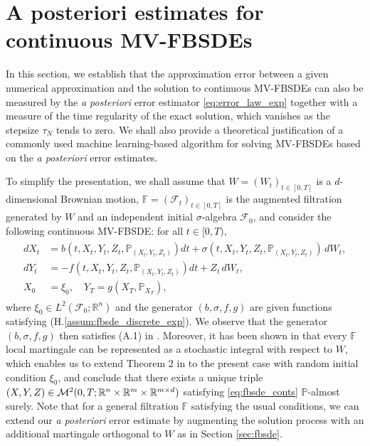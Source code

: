 \documentclass[11pt]{article}
\numberwithin{equation}{section}
\theoremstyle{definition}
\theoremstyle{remark}
\def\Om{\Omega}  \def\om{\omega} %
\newcommand{\q}{\quad}   \newcommand{\qq}{\qquad}
\def\l{\label}  \def\f{\frac}  \def\fa{\forall}
\def\cF{\mathcal{F}}
\def\cM{\mathcal{M}}
\def\sF{{\mathbb{F}}}
\def\sP{\mathbb{P}}
\def\sR{{\mathbb R}}
\begin{document}
\section{A posteriori  estimates for continuous MV-FBSDEs}\l{sec:a_posteriori_conts}
In this section, we  
  establish that 
 the  approximation error between a given numerical approximation and the solution to  continuous MV-FBSDEs
 can also be measured by the \textit{a posteriori} error estimator \eqref{eq:error_law_exp}
  together with
  a measure of 
    the time regularity of the exact solution, which vanishes as the  stepsize $\tau_N$ tends to zero.
{We shall also provide a theoretical justification 
of a commonly used machine learning-based algorithm for solving MV-FBSDEs
based on  the \textit{a posteriori}  error estimates.}


To simplify the presentation, 
we shall assume that
 $W=(W_t)_{t\in [0,T]}$  is
 a $d$-dimensional Brownian motion,
 $\sF=(\cF_t)_{t\in [0,T]}$ is the augmented filtration generated by $W$ and an independent initial $\sigma$-algebra $\cF_0$,
and consider the  following continuous MV-FBSDE: for all $t\in [0,T)$,
\begin{align}\l{eq:fbsde_conts}
\begin{split}
d X_t&=b(t,X_t,Y_t,Z_t,\sP_{(X_t,Y_t,Z_t)})dt +\sigma (t,X_t,Y_t,Z_t,\sP_{(X_t,Y_t,Z_t)})\, d W_t, 
\\
d Y_t&=-f(t,X_t,Y_t,Z_t, \sP_{(X_t,Y_t,Z_t)})dt+Z_t\,d W_t,
\\
X_0&=\xi_0,\q Y_T=g(X_T,\sP_{X_T}),
\end{split}
\end{align}
 where
 $\xi_0\in L^2(\cF_0;\sR^n)$ and
  the generator $(b, \sigma, f, g)$ are given functions satisfying 
 (H.\ref{assum:fbsde_discrete_exp}).
We observe that the generator $(b, \sigma, f, g)$ then satisfies  (A.1) in \cite{bensoussan2015}.
Moreover, it has been shown in \cite[Theorem  4.33 on p.~176]{jacod1987}
 that every $\sF$ local martingale can be represented as a stochastic integral with respect to $W$,
which enables us to extend 
Theorem 2 in \cite{bensoussan2015} to the present case with random initial condition $\xi_0$,
 and conclude that 
there exists a unique triple $(X,Y,Z)\in \cM^2(0,T;\sR^n\t \sR^m\t \sR^{m\t d })$
satisfying 
\eqref{eq:fbsde_conts} $\sP$-almost surely.
Note that for a general filtration $\sF$ satisfying the usual conditions,
we can extend our \textit{a posteriori} error estimate by augmenting the solution process with an additional 
martingale orthogonal to $W$
as in Section \ref{sec:fbsde}.
\end{document}
